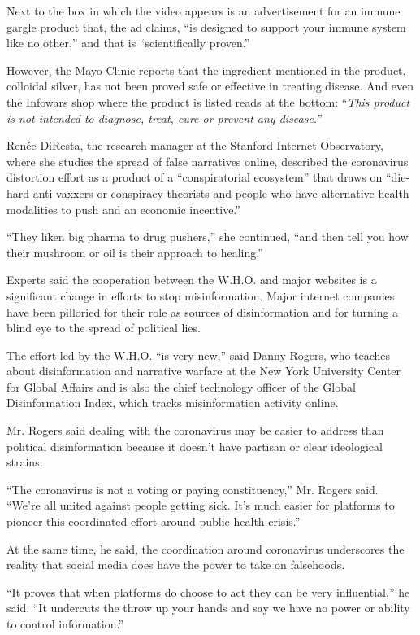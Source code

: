 Next to the box in which the video appears is an advertisement for an
immune gargle product that, the ad claims, ``is designed to support your
immune system like no other,'' and that is ``scientifically proven.''

However, the Mayo Clinic reports that the ingredient mentioned in the
product, colloidal silver, has not been proved safe or effective in
treating disease. And even the Infowars shop where the product is listed
reads at the bottom: ``\emph{This product is not intended to diagnose,
treat, cure or prevent any disease.''}

Renée DiResta, the research manager at the Stanford Internet
Observatory, where she studies the spread of false narratives online,
described the coronavirus distortion effort as a product of a
``conspiratorial ecosystem'' that draws on ``die-hard anti-vaxxers or
conspiracy theorists and people who have alternative health modalities
to push and an economic incentive.''

``They liken big pharma to drug pushers,'' she continued, ``and then
tell you how their mushroom or oil is their approach to healing.''

Experts said the cooperation between the W.H.O. and major websites is a
significant change in efforts to stop misinformation. Major internet
companies have been pilloried for their role as sources of
disinformation and for turning a blind eye to the spread of political
lies.

The effort led by the W.H.O. ``is very new,'' said Danny Rogers, who
teaches about disinformation and narrative warfare at the New York
University Center for Global Affairs and is also the chief technology
officer of the Global Disinformation Index, which tracks misinformation
activity online.

Mr. Rogers said dealing with the coronavirus may be easier to address
than political disinformation because it doesn't have partisan or clear
ideological strains.

``The coronavirus is not a voting or paying constituency,'' Mr. Rogers
said. ``We're all united against people getting sick. It's much easier
for platforms to pioneer this coordinated effort around public health
crisis.''

At the same time, he said, the coordination around coronavirus
underscores the reality that social media does have the power to take on
falsehoods.

``It proves that when platforms do choose to act they can be very
influential,'' he said. ``It undercuts the throw up your hands and say
we have no power or ability to control information.''

